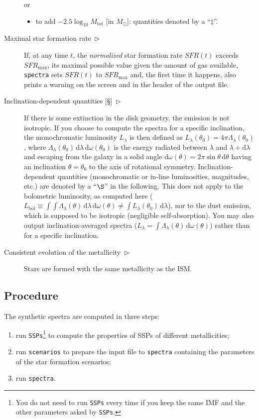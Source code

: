 \documentclass[11pt,draft,fleqn]{article}
\newcommand{\SFR}{\textit{SFR}}
\begin{document}
\begin{description}
or
\begin{itemize}
\item to add $-2.5\log_{10}M_{\mathrm{tot}}$ [in $M_{\odot}$]: quantities
denoted by a ``$\ddag$''.
\end{itemize}
\item[Maximal star formation rate~$\triangleright$]If, at any time $t$, the
\emph{normalized} star formation rate $\SFR(t)$
exceeds $\SFR_{\mathrm{max}}$,
its maximal possible value given the amount of gas available,
\texttt{spectra} sets $\SFR(t)$ to $\SFR_{\mathrm{max}}$ and,
the first time it happens, also prints a warning on the screen
and in the header of the output file.
\item[Inclination-dependent quantities {[\S]}~$\triangleright$]If
there is some extinction in the disk geometry, the emission is not isotropic. 
If you choose to compute the spectra for a specific inclination, 
the monochromatic luminosity $L_{\lambda}$ is then 
defined as $L_{\lambda}(\theta_0)=4\pi\Lambda_{\lambda}(\theta_0)$, where
$\Lambda_{\lambda}(\theta_0)\,\mathrm{d}\lambda\,\mathrm{d}\omega(\theta_0)$ is the
energy radiated between $\lambda$ and $\lambda+\mathrm{d}\lambda$ 
and escaping from the galaxy in a solid angle
$\mathrm{d}\omega(\theta)=2\pi\sin\theta\,\mathrm{d}\theta$ 
having an inclination $\theta=\theta_0$ to the axis of rotational symmetry.
Inclination-dependent quantities (monochromatic or in-line
luminosities, magnitudes, etc.) are denoted by a ``$\S$'' in the
following. This does not apply to the bolometric luminosity, as
computed here ($L_{\mathrm{bol}}\equiv\int\!\!\!\int
\Lambda_{\lambda}(\theta)\,\mathrm{d}\lambda\,\mathrm{d}\omega(\theta) 
\neq\int L_{\lambda}(\theta_0)\,\mathrm{d}\lambda$), nor to the dust
emission, which is supposed to be isotropic (negligible
self-absorption).
You may also output inclination-averaged spectra ($L_{\lambda}=\int
\Lambda_{\lambda}(\theta)\,\mathrm{d}\omega(\theta)$) rather than for
a specific inclination.
\item[Consistent evolution of the metallicity~$\triangleright$]Stars
are formed with the same metallicity as the ISM.
\end{description}
\subsection{Procedure}
The synthetic spectra are computed in three steps:
\begin{enumerate}
\item run \texttt{SSPs}\footnote{You do not need to run \texttt{SSPs}
every time if you keep the same IMF and the other parameters asked by 
\texttt{SSPs}.} to compute the properties of SSPs 
of different metallicities;
\item run \texttt{scenarios} to prepare the input file 
to \texttt{spectra} containing the parameters of the star formation scenarios;
\item run \texttt{spectra}.
\end{enumerate}
\end{document}
